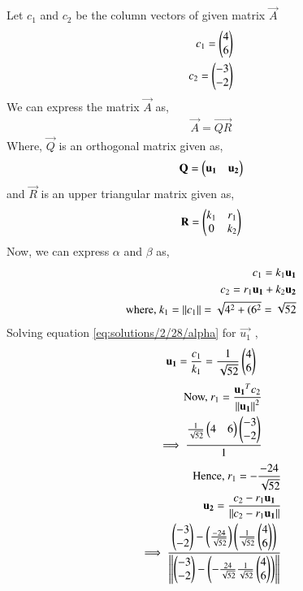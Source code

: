 Let $c_1$ and $c_2$ be the column vectors of given matrix $\vec{A}$
\begin{align}
c_1 = \begin{pmatrix}4\\6\end{pmatrix}\\
c_2 = \begin{pmatrix}-3\\-2\end{pmatrix}
\end{align}
We can express the matrix $\vec{A}$ as,
\begin{align}
\vec{A}=\vec{QR}
\end{align}
Where, $\vec{Q}$ is an orthogonal matrix given as,
\begin{align}
\mathbf{Q} = \begin{pmatrix}\mathbf{u_1}&\mathbf{u_2}\end{pmatrix}\label{eq:solutions/2/28/orthogonal}
\end{align}
and $\vec{R}$ is an upper triangular matrix given as,
\begin{align}
\mathbf{R} = \begin{pmatrix}k_1&r_1\\0&k_2\end{pmatrix}
\label{eq:solutions/2/28/UT}
\end{align}
Now, we can express $\alpha$ and $\beta$ as,
\begin{align}
c_1 = k_1\mathbf{u_1}\label{eq:solutions/2/28/alpha}\\
c_2 = r_1\mathbf{u_1} +k_2\mathbf{u_2}\label{eq:solutions/2/28/beta}\\
\mbox{where, } k_1 = \left\lVert c_1\right\rVert = \sqrt{4^2+(6^2} = \sqrt{52}\label{eq:solutions/2/28/k1}
\end{align} 
Solving equation \eqref{eq:solutions/2/28/alpha} for $\vec{u_1}$ ,
\begin{align}
\mathbf{u_1} = \frac{c_1}{k_1} = \frac{1}{\sqrt{52}}\begin{pmatrix}4\\6\end{pmatrix}\label{eq:solutions/2/28/u1}
\end{align}
\begin{align}
\mbox{Now, } r_1 = \frac{\mathbf{u_1}^Tc_2}{\left\lVert\mathbf{u_1}\right\rVert^2}\\
\implies \frac{\frac{1}{\sqrt{52}}\begin{pmatrix}4&6\end{pmatrix}\begin{pmatrix}-3\\-2\end{pmatrix}}{1}
\end{align}
\begin{align}
\mbox{Hence, } r_1 = -\frac{-24}{\sqrt{52}}
\label{eq:solutions/2/28/r1}\\
\mathbf{u_2} = \frac{c_2-r_1\mathbf{u_1}}{\left\lVert c_2-r_1\mathbf{u_1}\right\rVert}\\
\implies \frac{\begin{pmatrix}-3\\-2\end{pmatrix} - \left(\frac{-24}{\sqrt{52}}\right)\left(\frac{1}{\sqrt{52}}\begin{pmatrix}4\\6\end{pmatrix}\right)}{\left\lVert\begin{pmatrix}-3\\-2\end{pmatrix} - \left(-\frac{24}{\sqrt{52}}\frac{1}{\sqrt{52}}\begin{pmatrix}4\\6\end{pmatrix}\right)\right\rVert} 
\end{align}

